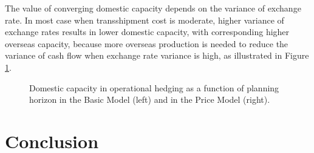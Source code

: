 \documentclass[mnsc,nonblindrev,copyedit]{informs2_wz} %
\newcommand{\OUT}[1]{}
\begin{document}
{The value of converging domestic capacity depends on the variance of exchange rate.  In most case when transshipment cost is moderate, higher variance of exchange rates results in lower domestic capacity, with corresponding higher overseas capacity, because more overseas production is needed to reduce the variance of cash
 flow when exchange rate variance is high, as illustrated in Figure
\ref{fig:ExVCap}.
\begin{figure}[ht]
\begin{center}
\begin{minipage}{6in}
    \begin{minipage}{3.1in}
        \epsfxsize=2.8in
    \hspace{-0.5in}    
    \end{minipage}
    \begin{minipage}{2.8in}
        \epsfxsize=2.8in
    \hspace{-0.5in}    
    \end{minipage}
\end{minipage}
\vspace{.05in} \caption{Domestic capacity in operational hedging as a function of planning horizon in the Basic Model (left) and in the Price Model (right).}\label{fig:ExVCap} \vspace{-.2in}
\end{center}
\end{figure}
}

\OUT{
\section{Comparison and Discussion }
Compare to Porteus and Chowdary. }





\section{Conclusion \label{sect:conclusion}}
\end{document}
